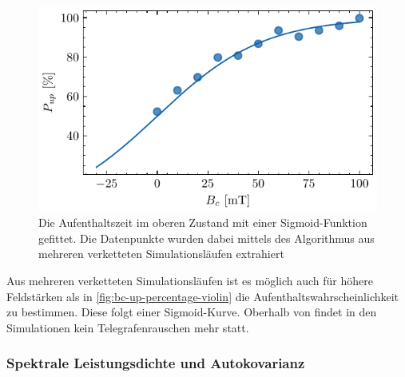 \documentclass[main.tex]{subfiles}
\begin{document}
\begin{figure}[H]
    \centering
    \includegraphics{bilder/plots/max_Bz/up_percentage_fit.pdf}
    \caption{Die Aufenthaltszeit im oberen Zustand mit einer Sigmoid-Funktion gefittet. Die Datenpunkte wurden dabei mittels des Algorithmus aus mehreren verketteten Simulationsläufen extrahiert}\label{fig:bc-up-percentage}
\end{figure}

Aus mehreren verketteten Simulationsläufen ist es möglich auch für höhere Feldstärken als in \cref{fig:bc-up-percentage-violin} die Aufenthaltswahrscheinlichkeit zu bestimmen. Diese folgt einer Sigmoid-Kurve.  Oberhalb von  findet in den Simulationen kein Telegrafenrauschen mehr statt.


\subsubsection{Spektrale Leistungsdichte und Autokovarianz}

\end{document}
